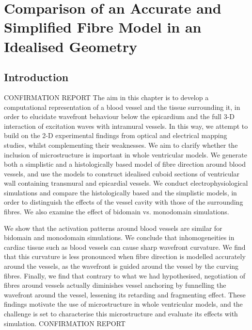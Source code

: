 \chapter{Comparison of an Accurate and Simplified Fibre Model in an Idealised Geometry}
\dblspace
\begin{quote}{\em }\end{quote}

\section{Introduction}
\label{sec:review:introduction}
CONFIRMATION REPORT
The aim in this chapter is to develop a computational representation of a blood vessel and the tissue surrounding it, in order to elucidate wavefront behaviour below the epicardium and the full 3-D interaction of excitation waves with intramural vessels. In this way, we attempt to build on the 2-D experimental findings from optical and electrical mapping studies, whilst complementing their weaknesses. We aim to clarify whether the inclusion of microstructure is important in whole ventricular models. We generate both a simplistic and a histologically based model of fibre direction around blood vessels, and use the models to construct idealised cuboid sections of ventricular wall containing transmural and epicardial vessels. We conduct electrophysiological simulations and compare the histologically based and the simplistic models, in order to distinguish the effects of the vessel cavity with those of the surrounding fibres. We also examine the effect of bidomain vs. monodomain simulations.

      We show that the activation patterns around blood vessels are similar for bidomain and monodomain simulations. We conclude that inhomogeneities in cardiac tissue such as blood vessels can cause sharp wavefront curvature. We find that this curvature is less pronounced when fibre direction is modelled accurately around the vessels, as the wavefront is guided around the vessel by the curving fibres. Finally, we find that contrary to what we had hypothesised, negotiation of fibres around vessels actually diminishes vessel anchoring by funnelling the wavefront around the vessel, lessening its retarding and fragmenting effect. These findings motivate the use of microstructure in whole ventricular models, and the challenge is set to characterise this microstructure and evaluate its effects with simulation.
CONFIRMATION REPORT


